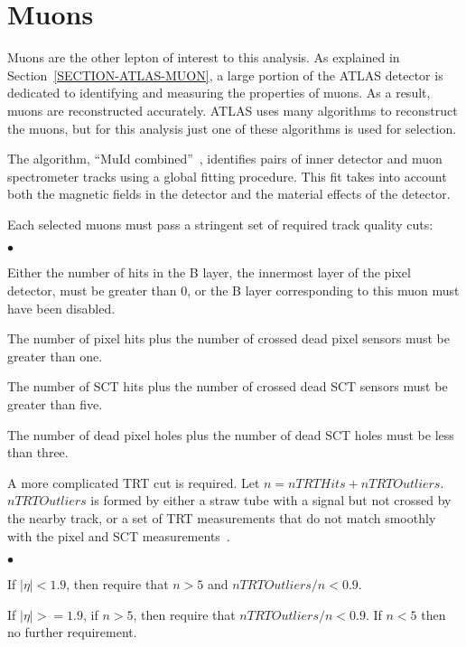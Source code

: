 \section{Muons}
\label{SECTION-DEFINEMUONS}
Muons are the other lepton of interest to this analysis. As explained in Section~\ref{SECTION-ATLAS-MUON}, a large portion of the ATLAS detector is dedicated to identifying and measuring the properties of muons. As a result, muons are reconstructed accurately. ATLAS uses many algorithms to reconstruct the muons, but for this analysis just one of these algorithms is used for selection.

The algorithm, ``MuId combined''~\cite{noteM1}, identifies pairs of inner detector and muon spectrometer tracks using a global fitting procedure. This fit takes into account both the magnetic fields in the detector and the material effects of the detector.

Each selected muons must pass a stringent set of required track quality cuts: 

\begin{list}{$\bullet$} {}
\item Either the number of hits in the B layer, the innermost layer of the pixel detector, must be greater than 0, or the B layer corresponding to this muon must have been disabled.
\item The number of pixel hits plus the number of crossed dead pixel sensors must be greater than one.
\item The number of SCT hits plus the number of crossed dead SCT sensors must be greater than five.
\item The number of dead pixel holes plus the number of dead SCT holes must be less than three.
\item A more complicated TRT cut is required. Let $n = nTRTHits + nTRTOutliers$. $nTRTOutliers$ is formed by either a straw tube with a signal but not crossed by the nearby track, or a set of TRT measurements that do not match smoothly with the pixel and SCT measurements~\cite{noteM1}.
\begin{list}{$\bullet$} {}
\item If $|\eta| < 1.9$, then require that $n > 5$ and $nTRTOutliers / n < 0.9$.
\item If $|\eta| >= 1.9$, if $n > 5$, then require that $nTRTOutliers / n < 0.9$.  If $n < 5$ then no further requirement.

\end{list}
\end{list}

